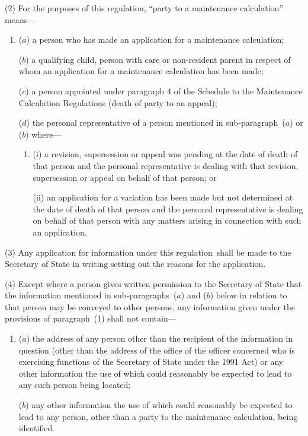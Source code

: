 \documentclass[12pt,a4paper]{article}
\begin{document}
(2) For the purposes of this regulation, “party to a maintenance calculation” means—
\begin{enumerate}\item[]
($a$) a person who has made an application for a maintenance calculation;

($b$) a qualifying child, person with care or non-resident parent in respect of whom an application for a maintenance calculation has been made;

($c$) a person appointed under 
paragraph 4 of the Schedule to the Maintenance Calculation Regulations  %
(death of party to an appeal);

($d$) the personal representative of a person mentioned in sub-\hspace{0pt}paragraph~($a$)  or ($b$)  where—
\begin{enumerate}\item[]
(i) a revision, supersession or appeal was pending at the date of death of that person and the personal representative is dealing with that revision, supersession or appeal on behalf of that person; or

(ii) an application for a variation has been made but not determined at the date of death of that person and the personal representative is dealing on behalf of that person with any matters arising in connection with such an application.
\end{enumerate}
\end{enumerate}

(3) Any application for information under this regulation~shall be made to the 
Secretary of State  %
in writing setting out the reasons for the application.

(4) Except where a person gives written permission to the 
Secretary of State  %
that the information mentioned in sub-paragraphs~($a$)  and ($b$)  below in relation to that person may be conveyed to other persons, any information given under the provisions of paragraph~(1) shall not contain—
\begin{enumerate}\item[]
($a$) the address of any person other than the recipient of the information in question (other than the address of the office of the officer concerned who is exercising functions of the 
Secretary of State  %
under the 1991 Act) or any other information the use of which could reasonably be expected to lead to any such person being located;

($b$) any other information the use of which could reasonably be expected to lead to any person, other than a party to the maintenance calculation, being identified.
\end{enumerate}
\end{document}
